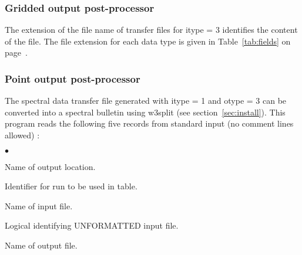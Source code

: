 \subsubsection{Gridded output post-processor} \label{sec:post_f}
\vsssub



\vspace{\baselineskip} 
\noindent
The extension of the file name of transfer files for {\F itype = 3} identifies
the content of the file. The file extension for each data type is given in
Table~\ref{tab:fields} on page~\pageref{tab:fields}.


\pb
\vsssub
\subsubsection{Point output post-processor} \label{sec:post_p}
\vsssub



\vspace{\baselineskip} 
\noindent 
The spectral data transfer file generated with {\F itype = 1} and {\F otype =
3} can be converted into a spectral bulletin using {\file w3split} (see
section~\ref{sec:install}). This program reads the following five records from
standard input (no comment lines allowed) :

\begin{list}{$\bullet$}{\itemsep 0mm \parsep 0mm}
\item Name of output location.
\item Identifier for run to be used in table.
\item Name of input file.
\item Logical identifying UNFORMATTED input file.
\item Name of output file.
\end{list}

